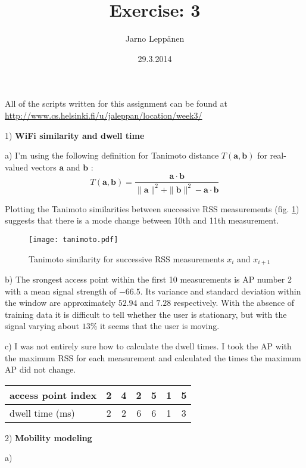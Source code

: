 \documentclass[a4paper,parskip=full]{scrartcl}
\author{Jarno Leppänen}
\title{Exercise: 3}
\date{29.3.2014}
\renewcommand{\vec}[1]{\mathbf{#1}}
\begin{document}
\maketitle

All of the scripts written for this assignment can be found at
\url{http://www.cs.helsinki.fi/u/jaleppan/location/week3/}

1) \textbf{WiFi similarity and dwell time}

  a) I'm using the following definition for Tanimoto distance
  $T(\vec{a}, \vec{b})$ for real-valued vectors $\vec{a}$ and $\vec{b}$
  \cite{chon2012automatically}:
  \begin{equation*}
    T(\vec{a}, \vec{b}) = \frac{\vec{a} \cdot \vec{b}}
        {\|\vec{a}\|^2 + \|\vec{b}\|^2 - \vec{a} \cdot \vec{b}}
  \end{equation*}

  Plotting the Tanimoto similarities between successive RSS measurements (fig.
  \ref{tanimoto}) suggests that there is a mode change between 10th and 11th
  measurement.
  \begin{figure}[h]
    \centering
    \texttt{[image: tanimoto.pdf]}
    \caption{Tanimoto similarity for successive RSS measurements $x_i$ and
      $x_{i+1}$}
    \label{tanimoto}
  \end{figure}

  b) The srongest access point within the first 10 measurements is AP number 2
  with a mean signal strength of $-66.5$. Its variance and standard deviation
  within the window are approximately $52.94$ and $7.28$ respectively. With the
  absence of training data it is difficult to tell whether the user is
  stationary, but with the signal varying about $13\%$ it seems that the user
  is moving.

  c) I was not entirely sure how to calculate the dwell times. I took the AP
  with the maximum RSS for each measurement and calculated the times the
  maximum AP did not change.

  \begin{tabular}{|l|c|c|c|c|c|c| }
    \hline
    access point index & 2 & 4 & 2 & 5 & 1 & 5 \\
    \hline
    dwell time (ms)    & 2 & 2 & 6 & 6 & 1 & 3 \\
    \hline
  \end{tabular}

2) \textbf{Mobility modeling}

  a)
\end{document}
